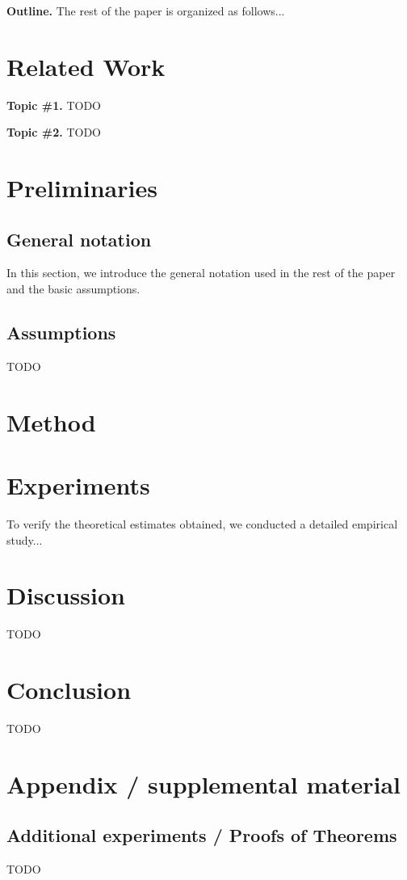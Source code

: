 \documentclass{article}
\begin{document}
\textbf{Outline.} The rest of the paper is organized as follows...

\section{Related Work}\label{sec:rw}

\textbf{Topic \#1.}
TODO

\textbf{Topic \#2.}
TODO

\section{Preliminaries}\label{sec:prelim}

\subsection{General notation}

In this section, we introduce the general notation used in the rest of the paper and the basic assumptions. 

\subsection{Assumptions} 

TODO

\section{Method}\label{sec:method}

\section{Experiments}\label{sec:exp}

To verify the theoretical estimates obtained, we conducted a detailed empirical study...

\section{Discussion}\label{sec:disc}

TODO

\section{Conclusion}\label{sec:concl}

TODO







\newpage
\appendix
\section{Appendix / supplemental material}\label{app}

\subsection{Additional experiments / Proofs of Theorems}\label{app:exp}

TODO
\end{document}
